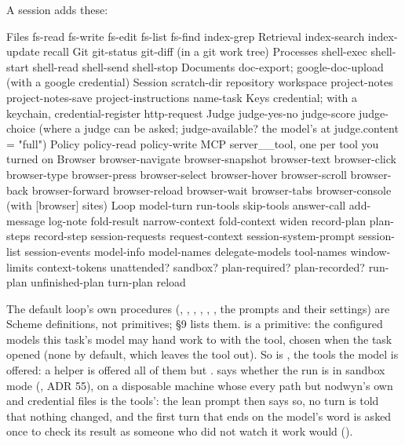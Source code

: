 A session adds these:

\begin{txt}
Files        fs-read fs-write fs-edit fs-list fs-find index-grep
Retrieval    index-search index-update recall
Git          git-status git-diff                   (in a git work tree)
Processes    shell-exec shell-start shell-read shell-send shell-stop
Documents    doc-export; google-doc-upload             (with a google credential)
Session      scratch-dir repository workspace project-notes project-notes-save
             project-instructions name-task
Keys         credential; with a keychain, credential-register http-request
Judge        judge-yes-no judge-score judge-choice   (where a judge can be asked;
             judge-available?                     the model's at judge.content = "full")
Policy       policy-read policy-write
MCP          server__tool, one per tool you turned on
Browser      browser-navigate browser-snapshot browser-text browser-click
             browser-type browser-press browser-select browser-hover
             browser-scroll browser-back browser-forward browser-reload
             browser-wait browser-tabs browser-console  (with [browser] sites)
Loop         model-turn run-tools skip-tools answer-call add-message log-note
             fold-result narrow-context fold-context widen record-plan
             plan-steps record-step
             session-requests request-context session-system-prompt session-list session-events
             model-info model-names delegate-models tool-names window-limits
             context-tokens
             unattended? sandbox? plan-required? plan-recorded? run-plan
             unfinished-plan turn-plan reload
\end{txt}

\begin{sloppypar}
The default loop's own procedures (, ,
, , ,
, the prompts and their settings) are Scheme
definitions, not primitives;  \S9 lists them.
 is a primitive: the configured models this task's
model may hand work to with the  tool, chosen when the task
opened (none by default, which leaves the tool out). So is
, the tools the model is offered: a helper is offered all
of them but .
 says whether the run is in sandbox mode
(, ADR 55), on a disposable machine
whose every path but nodwyn's own and credential files is the tools': the
lean prompt then says so, no turn is told that nothing changed, and the
first turn that ends on the model's word is asked once to check its result
as someone who did not watch it work would
().
\end{sloppypar}

